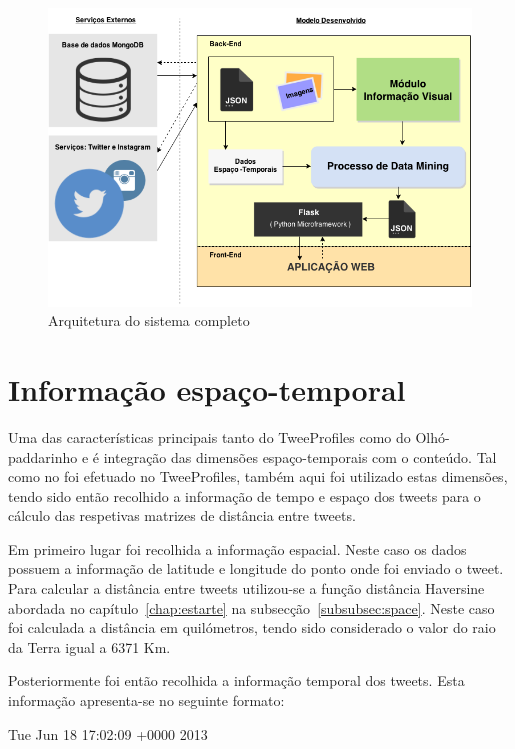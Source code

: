 \begin{figure}[h]
\centering
\includegraphics[width=1.0\linewidth]{./figures/arquitetura_sistema}
\caption{Arquitetura do sistema completo}
\label{fig:archsys}
\end{figure}


\section{Informação espaço-temporal} \label{sec:infoesptmp}

Uma das características principais tanto do TweeProfiles como do Olhó-paddarinho e é integração das dimensões espaço-temporais com o conteúdo. Tal como no foi efetuado no TweeProfiles, também aqui foi utilizado estas dimensões, tendo sido então recolhido a informação de tempo e espaço dos tweets para o cálculo das respetivas matrizes de distância entre tweets.

Em primeiro lugar foi recolhida a informação espacial. Neste caso os dados possuem a informação de latitude e longitude do ponto onde foi enviado o tweet. Para calcular a distância entre tweets utilizou-se a função distância Haversine abordada no capítulo~\ref{chap:estarte} na subsecção~\ref{subsubsec:space}. Neste caso foi calculada a distância em quilómetros, tendo sido considerado o valor do raio da Terra igual a 6371 Km.

Posteriormente foi então recolhida a informação temporal dos tweets. Esta informação apresenta-se no seguinte formato:

\vspace{2mm}
Tue Jun 18 17:02:09 +0000 2013
\vspace{2mm}

